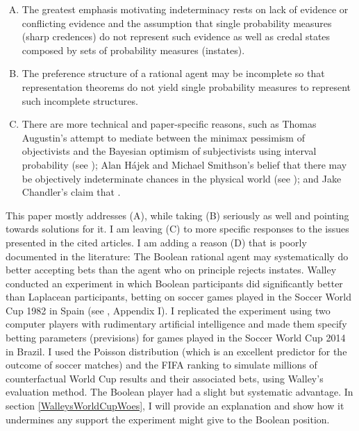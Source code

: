 \documentclass[11pt]{article}
\begin{document}
\begin{enumerate}[(A)]
\item The greatest emphasis motivating indeterminacy rests on lack of
  evidence or conflicting evidence and the assumption that single
  probability measures (sharp credences) do not represent such
  evidence as well as credal states composed by sets of probability
  measures (instates).
\item The preference structure of a rational agent may be incomplete
  so that representation theorems do not yield single probability
  measures to represent such incomplete structures.
\item There are more technical and paper-specific reasons, such as
  Thomas Augustin's attempt to mediate between the minimax pessimism
  of objectivists and the Bayesian optimism of subjectivists using
  interval probability (see ); Alan
  H{\'a}jek and Michael Smithson's belief that there may be
  objectively indeterminate chances in the physical world (see
  ); and Jake Chandler's claim that
   .
\end{enumerate}

This paper mostly addresses (A), while taking (B) seriously as well
and pointing towards solutions for it. I am leaving (C) to more
specific responses to the issues presented in the cited articles. I am
adding a reason (D) that is poorly documented in the literature: The
Boolean rational agent may systematically do better accepting bets
than the agent who on principle rejects instates.  Walley conducted an
experiment in which Boolean participants did significantly better than
Laplacean participants, betting on soccer games played in the Soccer
World Cup 1982 in Spain (see , Appendix I). I
replicated the experiment using two computer players with rudimentary
artificial intelligence and made them specify betting parameters
(previsions) for games played in the Soccer World Cup 2014 in Brazil.
I used the Poisson distribution (which is an excellent predictor for
the outcome of soccer matches) and the FIFA ranking to simulate
millions of counterfactual World Cup results and their associated
bets, using Walley's evaluation method.  The Boolean player had a
slight but systematic advantage. In section \ref{WalleysWorldCupWoes},
I will provide an explanation and show how it undermines any support
the experiment might give to the Boolean position.
\end{document}
